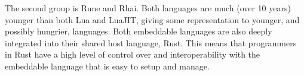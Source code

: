 The second group is Rune and Rhai. Both languages are much (over 10 years) younger than both Lua and LuaJIT, giving some representation to younger, and possibly hungrier, languages. Both embeddable languages are also deeply integrated into their shared host language, Rust. This means that programmers in Rust have a high level of control over and interoperability with the embeddable language that is easy to setup and manage.
